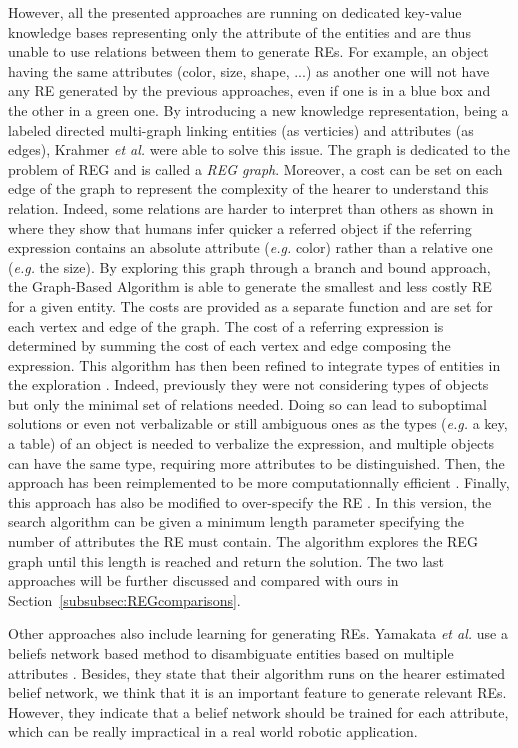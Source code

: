 \documentclass[a4paper,11pt,twoside]{StyleThese}
\begin{document}
However, all the presented approaches are running on dedicated key-value knowledge bases representing only the attribute of the entities and are thus unable to use relations between them to generate REs. For example, an object having the same attributes (color, size, shape, ...) as another one will not have any RE generated by the previous approaches, even if one is in a blue box and the other in a green one. By introducing a new knowledge representation, being a labeled directed multi-graph linking entities (as verticies) and attributes (as edges), Krahmer \textit{et al.} were able to solve this issue. The graph is dedicated to the problem of REG and is called a \textit{REG graph}. Moreover, a cost can be set on each edge of the graph to represent the complexity of the hearer to understand this relation. Indeed, some relations are harder to interpret than others as shown in \cite{belke2002tracking} where they show that humans infer quicker a referred object if the referring expression contains an absolute attribute (\textit{e.g.} color) rather than a relative one (\textit{e.g.} the size). By exploring this graph through a branch and bound approach, the Graph-Based Algorithm \cite{krahmer2003graph} is able to generate the smallest and less costly RE for a given entity. The costs are provided as a separate function and are set for each vertex and edge of the graph. The cost of a referring expression is determined by summing the cost of each vertex and edge composing the expression. This algorithm has then been refined to integrate types of entities in the exploration \cite{krahmer2012computational}. Indeed, previously they were not considering types of objects but only the minimal set of relations needed. Doing so can lead to suboptimal solutions or even not verbalizable or still ambiguous ones as the types (\textit{e.g.} a key, a table) of an object is needed to verbalize the expression, and multiple objects can have the same type, requiring more attributes to be distinguished. Then, the approach has been reimplemented to be more computationnally efficient \cite{li2017automatically}. Finally, this approach has also be modified to over-specify the RE \cite{viethen2013graphs}. In this version, the search algorithm can be given a minimum length parameter specifying the number of attributes the RE must contain. The algorithm explores the REG graph until this length is reached and return the solution. The two last approaches will be further discussed and compared with ours in Section~\ref{subsubsec:REGcomparisons}.

Other approaches also include learning for generating REs. Yamakata \textit{et al.} use a beliefs network based method to disambiguate entities based on multiple attributes \cite{yamakata2004belief}. Besides, they state that their algorithm runs on the hearer estimated belief network, we think that it is an important feature to generate relevant REs. However, they indicate that a belief network should be trained for each attribute, which can be really impractical in a real world robotic application.
\end{document}
